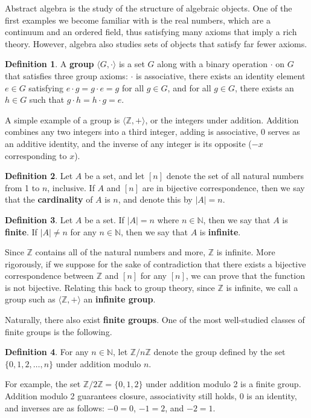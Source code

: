 \documentclass[openany, amssymb, psamsfonts]{amsart}
\theoremstyle{definition}
\newtheorem{defn}{Definition}[section]
\numberwithin{equation}{section}
\begin{document}
Abstract algebra is the study of the structure of algebraic objects. One of the first examples we become familiar with is the real numbers, which are a continuum and an ordered field, thus satisfying many axioms that imply a rich theory. However, algebra also studies sets of objects that satisfy far fewer axioms.\par
\begin{defn}
    A \textbf{group} $\langle G,\cdot\rangle$ is a set $G$ along with a binary operation $\cdot$ on $G$ that satisfies three group axioms: $\cdot$ is associative, there exists an identity element $e\in G$ satisfying $e\cdot g=g\cdot e=g$ for all $g\in G$, and for all $g\in G$, there exists an $h\in G$ such that $g\cdot h=h\cdot g=e$.
\end{defn}
A simple example of a group is $\langle\mathbb{Z},+\rangle$, or the integers under addition. Addition combines any two integers into a third integer, adding is associative, 0 serves as an additive identity, and the inverse of any integer is its opposite ($-x$ corresponding to $x$).
\begin{defn}
    Let $A$ be a set, and let $[n]$ denote the set of all natural numbers from 1 to $n$, inclusive. If $A$ and $[n]$ are in bijective correspondence, then we say that the \textbf{cardinality} of $A$ is $n$, and denote this by $|A|=n$.
\end{defn}
\begin{defn}
    Let $A$ be a set. If $|A|=n$ where $n\in\mathbb{N}$, then we say that $A$ is \textbf{finite}. If $|A|\neq n$ for any $n\in\mathbb{N}$, then we say that $A$ is \textbf{infinite}.
\end{defn}
Since $\mathbb{Z}$ contains all of the natural numbers and more, $\mathbb{Z}$ is infinite. More rigorously, if we suppose for the sake of contradiction that there exists a bijective correspondence between $\mathbb{Z}$ and $[n]$ for any $[n]$, we can prove that the function is not bijective. Relating this back to group theory, since $\mathbb{Z}$ is infinite, we call a group such as $\langle\mathbb{Z},+\rangle$ an \textbf{infinite group}.\par
Naturally, there also exist \textbf{finite groups}. One of the most well-studied classes of finite groups is the following.
\begin{defn}
    For any $n\in\mathbb{N}$, let $\mathbb{Z}/n\mathbb{Z}$ denote the group defined by the set $\{0,1,2,\dots,n\}$ under addition modulo $n$.
\end{defn}
For example, the set $\mathbb{Z}/2\mathbb{Z}=\{0,1,2\}$ under addition modulo 2 is a finite group. Addition modulo 2 guarantees closure, associativity still holds, 0 is an identity, and inverses are as follows: $-0=0$, $-1=2$, and $-2=1$.\par
\end{document}
